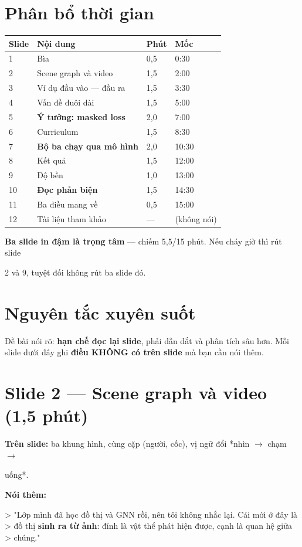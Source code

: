\documentclass[11pt,a4paper]{article}
\begin{document}
\section{Phân bổ thời gian}
\begin{center}\small
\begin{tabular}{@{}llll@{}}
\toprule
\textbf{Slide} & \textbf{Nội dung} & \textbf{Phút} & \textbf{Mốc}\\
\midrule
1 & Bìa & 0,5 & 0:30\\
2 & Scene graph và video & 1,5 & 2:00\\
3 & Ví dụ đầu vào --- đầu ra & 1,5 & 3:30\\
4 & Vấn đề đuôi dài & 1,5 & 5:00\\
5 & \textbf{Ý tưởng: masked loss} & 2,0 & 7:00\\
6 & Curriculum & 1,5 & 8:30\\
7 & \textbf{Bộ ba chạy qua mô hình} & 2,0 & 10:30\\
8 & Kết quả & 1,5 & 12:00\\
9 & Độ bền & 1,0 & 13:00\\
10 & \textbf{Đọc phản biện} & 1,5 & 14:30\\
11 & Ba điều mang về & 0,5 & 15:00\\
12 & Tài liệu tham khảo & --- & (không nói)\\
\bottomrule
\end{tabular}
\end{center}
\textbf{Ba slide in đậm là trọng tâm} --- chiếm 5,5/15 phút. Nếu cháy giờ thì rút slide

2 và 9, tuyệt đối không rút ba slide đó.

\section{Nguyên tắc xuyên suốt}
Đề bài nói rõ: \textbf{hạn chế đọc lại slide}, phải dẫn dắt và phân tích sâu hơn. Mỗi slide dưới đây ghi \textbf{điều KHÔNG có trên slide} mà bạn cần nói thêm.

\section{Slide 2 --- Scene graph và video (1,5 phút)}
\textbf{Trên slide:} ba khung hình, cùng cặp (người, cốc), vị ngữ đổi *nhìn $\rightarrow$ chạm $\rightarrow$

uống*.

\textbf{Nói thêm:}

> "Lớp mình đã học đồ thị và GNN rồi, nên tôi không nhắc lại. Cái mới ở đây là > đồ thị \textbf{sinh ra từ ảnh}: đỉnh là vật thể phát hiện được, cạnh là quan hệ giữa > chúng."
\end{document}
